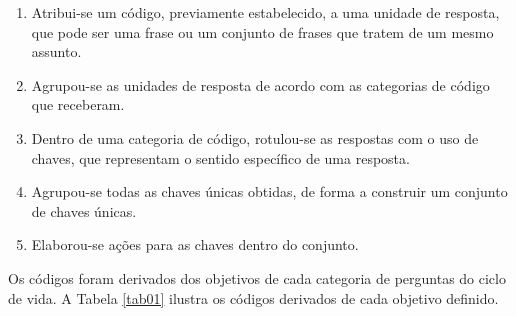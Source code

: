 \begin{enumerate}
	\item Atribui-se um código, previamente estabelecido, a uma unidade de resposta, que pode ser uma frase ou um conjunto de frases que tratem de um mesmo assunto.
	\item Agrupou-se as unidades de resposta de acordo com as categorias de código que receberam.
	\item Dentro de uma categoria de código, rotulou-se as respostas com o uso de chaves, que representam o sentido específico de uma resposta.
	\item Agrupou-se todas as chaves únicas obtidas, de forma a construir um conjunto de chaves únicas.
	\item Elaborou-se ações para as chaves dentro do conjunto.
\end{enumerate}

Os códigos foram derivados dos objetivos de cada categoria de perguntas do ciclo de vida. A Tabela \ref{tab01} ilustra os códigos derivados de cada objetivo definido.


